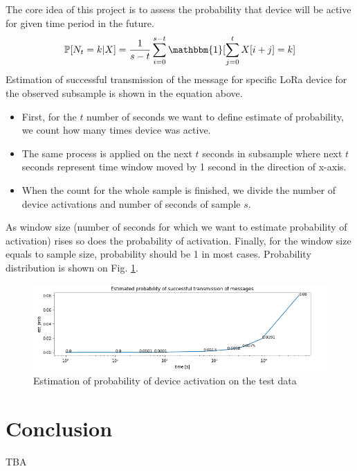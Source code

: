 \documentclass[11pt, a4paper]{article} %
\begin{document}
The core idea of this project is to assess the probability that device will be active for given time period in the future.
$$ \mathbb{P}[N_{t} = k | X] =  \frac{1}{s-t}  \sum_{i=0}^{s-t}\mathbbm{1}[\sum_{j=0}^{t}X[i+j]=k] $$
Estimation of successful transmission of the message for specific LoRa device for the observed subsample is shown in the equation above.
\begin{itemize}
	\item First, for the $ t $ number of seconds we want to define estimate of probability, we count how many times device was active.
	\item The same process is applied on the next $ t $ seconds in subsample where next $ t $ seconds represent time window moved by 1 second in the direction of x-axis.
	\item When the count for the whole sample is finished, we divide the number of device activations and number of seconds of sample $ s $. 
\end{itemize} 
As window size (number of seconds for which we want to estimate probability of activation) rises so does the probability of activation. Finally, for the window size equals to sample size, probability should be 1 in most cases. 
Probability distribution is shown on Fig. \ref{est-prob}.
\begin{figure}
	\centering
	\includegraphics[scale=.6]{images/est-prob.png} %
	\caption{Estimation of probability of device activation on the test data}
	\label{est-prob} 
\end{figure}


\section{Conclusion}
TBA


\printbibliography

\end{document}

